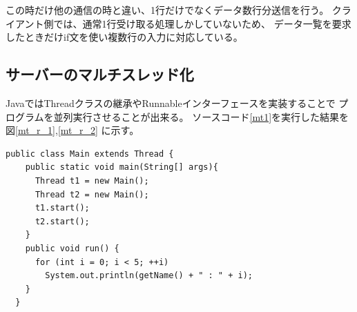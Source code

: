 \documentclass[dvipdfmx]{jsarticle}
\begin{document}
この時だけ他の通信の時と違い、1行だけでなくデータ数行分送信を行う。
クライアント側では、通常1行受け取る処理しかしていないため、
データ一覧を要求したときだけif文を使い複数行の入力に対応している。

\subsection{サーバーのマルチスレッド化}

JavaではThreadクラスの継承やRunnableインターフェースを実装することで
プログラムを並列実行させることが出来る。
ソースコード\ref{mt1}を実行した結果を図\ref{mt_r_1},\ref{mt_r_2}
に示す。
\begin{lstlisting}[caption=マルチスレッドの例,label=mt1]
  public class Main extends Thread {
    public static void main(String[] args){
      Thread t1 = new Main();
      Thread t2 = new Main();
      t1.start();
      t2.start();
    }
    public void run() {
      for (int i = 0; i < 5; ++i)
        System.out.println(getName() + " : " + i);
    }
  }  
\end{lstlisting}
\end{document}
